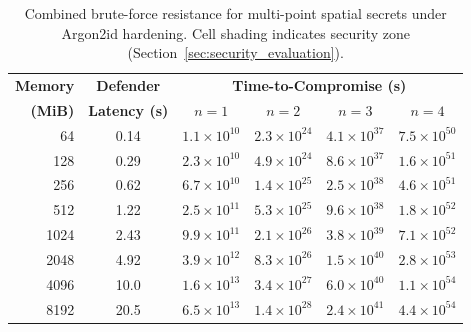 \documentclass[journal,article,submit,pdftex,moreauthors]{Definitions/mdpi}
\begin{document}
\begin{table}[H]
\caption{Combined brute-force resistance for multi-point spatial secrets under Argon2id hardening. Cell shading indicates security zone (Section~\ref{sec:security_evaluation}).}
\label{tab:combined_spatial_computational}
\centering
\begin{tabular}{rccccc}
\toprule
\textbf{Memory} & \textbf{Defender} & \multicolumn{4}{c}{\textbf{Time-to-Compromise (s)}} \\
\textbf{(MiB)} & \textbf{Latency (s)} & \textbf{$n=1$} & \textbf{$n=2$} & \textbf{$n=3$} & \textbf{$n=4$} \\
\midrule
64   & 0.14 &
\cellcolor{humanscale}$1.1\times10^{10}$ &
\cellcolor{humanscale}$2.3\times10^{24}$ &
\cellcolor{supersecure}$4.1\times10^{37}$ &
\cellcolor{supersecure}$7.5\times10^{50}$ \\

128  & 0.29 &
\cellcolor{humanscale}$2.3\times10^{10}$ &
\cellcolor{humanscale}$4.9\times10^{24}$ &
\cellcolor{supersecure}$8.6\times10^{37}$ &
\cellcolor{supersecure}$1.6\times10^{51}$ \\

256  & 0.62 &
\cellcolor{humanscale}$6.7\times10^{10}$ &
\cellcolor{humanscale}$1.4\times10^{25}$ &
\cellcolor{supersecure}$2.5\times10^{38}$ &
\cellcolor{supersecure}$4.6\times10^{51}$ \\

512  & 1.22 &
\cellcolor{humanscale}$2.5\times10^{11}$ &
\cellcolor{humanscale}$5.3\times10^{25}$ &
\cellcolor{supersecure}$9.6\times10^{38}$ &
\cellcolor{supersecure}$1.8\times10^{52}$ \\

1024 & 2.43 &
\cellcolor{humanscale}$9.9\times10^{11}$ &
\cellcolor{humanscale}$2.1\times10^{26}$ &
\cellcolor{supersecure}$3.8\times10^{39}$ &
\cellcolor{supersecure}$7.1\times10^{52}$ \\

2048 & 4.92 &
\cellcolor{humanscale}$3.9\times10^{12}$ &
\cellcolor{humanscale}$8.3\times10^{26}$ &
\cellcolor{supersecure}$1.5\times10^{40}$ &
\cellcolor{supersecure}$2.8\times10^{53}$ \\

4096 & 10.0 &
\cellcolor{humanscale}$1.6\times10^{13}$ &
\cellcolor{humanscale}$3.4\times10^{27}$ &
\cellcolor{supersecure}$6.0\times10^{40}$ &
\cellcolor{supersecure}$1.1\times10^{54}$ \\

8192 & 20.5 &
\cellcolor{humanscale}$6.5\times10^{13}$ &
\cellcolor{humanscale}$1.4\times10^{28}$ &
\cellcolor{supersecure}$2.4\times10^{41}$ &
\cellcolor{supersecure}$4.4\times10^{54}$ \\


\end{tabular}
\end{table}
\end{document}
